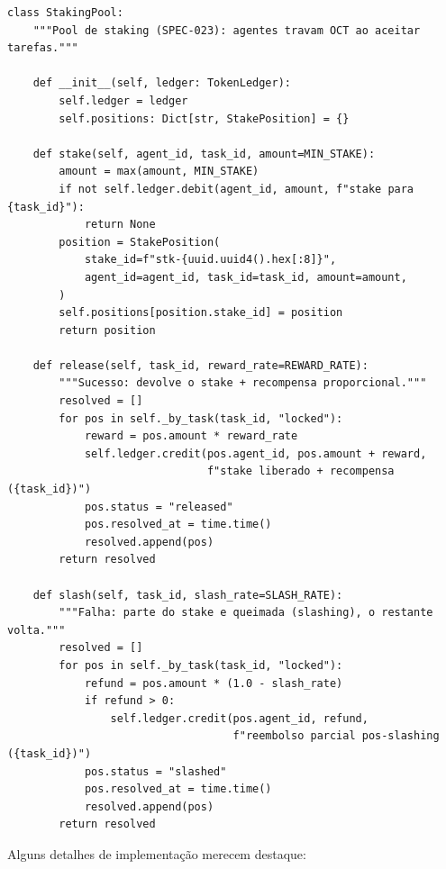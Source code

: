 \begin{verbatim}
class StakingPool:
    """Pool de staking (SPEC-023): agentes travam OCT ao aceitar tarefas."""

    def __init__(self, ledger: TokenLedger):
        self.ledger = ledger
        self.positions: Dict[str, StakePosition] = {}

    def stake(self, agent_id, task_id, amount=MIN_STAKE):
        amount = max(amount, MIN_STAKE)
        if not self.ledger.debit(agent_id, amount, f"stake para {task_id}"):
            return None
        position = StakePosition(
            stake_id=f"stk-{uuid.uuid4().hex[:8]}",
            agent_id=agent_id, task_id=task_id, amount=amount,
        )
        self.positions[position.stake_id] = position
        return position

    def release(self, task_id, reward_rate=REWARD_RATE):
        """Sucesso: devolve o stake + recompensa proporcional."""
        resolved = []
        for pos in self._by_task(task_id, "locked"):
            reward = pos.amount * reward_rate
            self.ledger.credit(pos.agent_id, pos.amount + reward,
                               f"stake liberado + recompensa ({task_id})")
            pos.status = "released"
            pos.resolved_at = time.time()
            resolved.append(pos)
        return resolved

    def slash(self, task_id, slash_rate=SLASH_RATE):
        """Falha: parte do stake e queimada (slashing), o restante volta."""
        resolved = []
        for pos in self._by_task(task_id, "locked"):
            refund = pos.amount * (1.0 - slash_rate)
            if refund > 0:
                self.ledger.credit(pos.agent_id, refund,
                                   f"reembolso parcial pos-slashing ({task_id})")
            pos.status = "slashed"
            pos.resolved_at = time.time()
            resolved.append(pos)
        return resolved
\end{verbatim}

Alguns detalhes de implementação merecem destaque:


